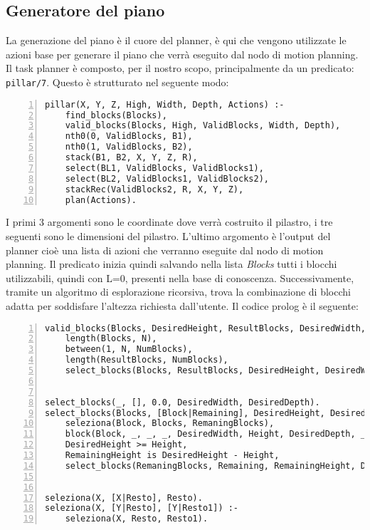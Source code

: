 \subsection{Generatore del piano}
\label{subsec:generatorepiano}
La generazione del piano è il cuore del planner, è qui che vengono utilizzate le azioni base per generare il piano che verrà eseguito dal nodo di motion planning. Il task planner è composto, per il nostro scopo, principalmente da un predicato: \verb+pillar/7+.
Questo è strutturato nel seguente modo:
\begin{lstlisting}[numbers=left]
pillar(X, Y, Z, High, Width, Depth, Actions) :-
    find_blocks(Blocks),
    valid_blocks(Blocks, High, ValidBlocks, Width, Depth),
    nth0(0, ValidBlocks, B1),
    nth0(1, ValidBlocks, B2),
    stack(B1, B2, X, Y, Z, R),
    select(BL1, ValidBlocks, ValidBlocks1),
    select(BL2, ValidBlocks1, ValidBlocks2),
    stackRec(ValidBlocks2, R, X, Y, Z),
    plan(Actions).
\end{lstlisting}
I primi 3 argomenti sono le coordinate dove verrà costruito il pilastro, i tre seguenti sono le dimensioni del pilastro. L'ultimo argomento è l'output del planner cioè una lista di azioni che verranno eseguite dal nodo di motion planning.
Il predicato inizia quindi salvando nella lista \textit{Blocks} tutti i blocchi utilizzabili, quindi con L=0, presenti nella base di conoscenza.
Successivamente, tramite un algoritmo di esplorazione ricorsiva, trova la combinazione di blocchi adatta per soddisfare l'altezza richiesta dall'utente. Il codice prolog è il seguente:
\begin{lstlisting}[numbers=left]
valid_blocks(Blocks, DesiredHeight, ResultBlocks, DesiredWidth, DesiredDepth) :-
    length(Blocks, N),               
    between(1, N, NumBlocks),        
    length(ResultBlocks, NumBlocks),  
    select_blocks(Blocks, ResultBlocks, DesiredHeight, DesiredWidth, DesiredDepth). 


select_blocks(_, [], 0.0, DesiredWidth, DesiredDepth). 
select_blocks(Blocks, [Block|Remaining], DesiredHeight, DesiredWidth, DesiredDepth) :-
    seleziona(Block, Blocks, RemaningBlocks), 
    block(Block, _, _, _, DesiredWidth, Height, DesiredDepth, _, _, _, _, _, _), 
    DesiredHeight >= Height,                
    RemainingHeight is DesiredHeight - Height,
    select_blocks(RemaningBlocks, Remaining, RemainingHeight, DesiredWidth, DesiredDepth). 


seleziona(X, [X|Resto], Resto).
seleziona(X, [Y|Resto], [Y|Resto1]) :-
    seleziona(X, Resto, Resto1).
\end{lstlisting}
